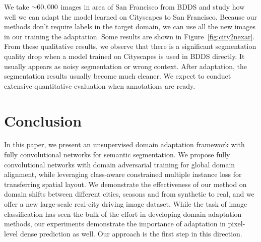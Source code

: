 \documentclass[10pt,twocolumn,letterpaper]{article}
\begin{document}
We take $\scriptsize{\sim} 60,000$ images in area of San Francisco from BDDS and study how well we can adapt the model learned on Cityscapes to San Francisco. Because our methods don't require labels in the target domain, we can use all the new images in our training the adaptation. Some results are shown in Figure~\ref{fig:city2nexar}. From these qualitative results, we observe that there is a significant segmentation quality drop when a model trained on Cityscapes is used in BDDS directly. It usually appears as noisy segmentation or wrong context. After adaptation, the segmentation results usually become much cleaner. We expect to conduct extensive quantitative evaluation when annotations are ready.

















 \section{Conclusion}
\label{sec:conclusion}

In this paper, we present an unsupervised domain adaptation framework with fully convolutional networks for semantic segmentation. We propose fully convolutional networks with domain adversarial training for global domain alignment, while leveraging class-aware constrained multiple instance loss for transferring spatial layout. We demonstrate the effectiveness of our method on domain shifts between different cities, seasons and from synthetic to real, and we offer a new large-scale real-city driving image dataset. While the task of image classification has seen the bulk of the effort in developing domain adaptation methods, our experiments demonstrate the importance of adaptation in pixel-level dense prediction as well. Our approach is the first step in this direction. 

\clearpage

\begin{spacing}{1.15}
\small


\end{spacing}
\end{document}
